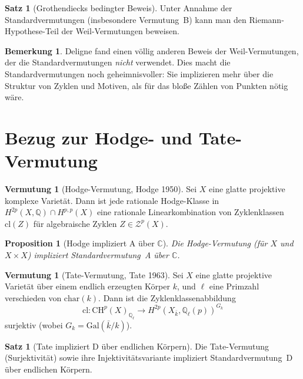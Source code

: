 \documentclass[12pt,a4paper]{amsart}
\newtheorem{proposition}[theorem]{Proposition}
\theoremstyle{definition}
\newtheorem{satz}[theorem]{Satz}
\newtheorem{vermutung}[theorem]{Vermutung}
\newtheorem{bemerkung}[theorem]{Bemerkung}
\newcommand{\Q}{\mathbb{Q}}
\newcommand{\C}{\mathbb{C}}
\newcommand{\Gal}{\mathrm{Gal}}
\newcommand{\CH}{\mathrm{CH}}
\newcommand{\cl}{\mathrm{cl}}
\newcommand{\ch}{\mathrm{char}}
\begin{document}
\begin{satz}[Grothendiecks bedingter Beweis]
Unter Annahme der Standardvermutungen (insbesondere Vermutung~B) kann man
den Riemann-Hypothese-Teil der Weil-Vermutungen beweisen.
\end{satz}

\begin{bemerkung}
Deligne fand einen völlig anderen Beweis der Weil-Vermutungen, der die
Standardvermutungen \emph{nicht} verwendet.  Dies macht die Standardvermutungen
noch geheimnisvoller: Sie implizieren mehr über die Struktur von Zyklen
und Motiven, als für das bloße Zählen von Punkten nötig wäre.
\end{bemerkung}

\section{Bezug zur Hodge- und Tate-Vermutung}\label{sec:hodge}

\begin{vermutung}[Hodge-Vermutung, Hodge 1950]
Sei $X$ eine glatte projektive komplexe Varietät.  Dann ist jede rationale
Hodge-Klasse in $H^{2p}(X,\Q) \cap H^{p,p}(X)$ eine rationale Linearkombination
von Zyklenklassen $\cl(Z)$ für algebraische Zyklen $Z \in \mathcal{Z}^p(X)$.
\end{vermutung}

\begin{proposition}[Hodge impliziert A über $\C$]
Die Hodge-Vermutung (für $X$ und $X \times X$) impliziert Standardvermutung~A
über $\C$.
\end{proposition}

\begin{vermutung}[Tate-Vermutung, Tate 1963]
Sei $X$ eine glatte projektive Varietät über einem endlich erzeugten Körper $k$,
und $\ell$ eine Primzahl verschieden von $\ch(k)$.  Dann ist die Zyklenklassenabbildung
\[
  \cl: \CH^p(X)_{\Q_\ell} \to H^{2p}(X_{\bar k}, \Q_\ell(p))^{G_k}
\]
surjektiv (wobei $G_k = \Gal(\bar k/k)$).
\end{vermutung}

\begin{satz}[Tate impliziert D über endlichen Körpern]
Die Tate-Vermutung (Surjektivität) sowie ihre Injektivitätsvariante impliziert
Standardvermutung~D über endlichen Körpern.
\end{satz}

\end{document}

